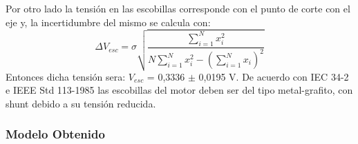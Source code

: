 \documentclass[11pt,letterpaper]{article}     %
\begin{document}
Por otro lado la tensión en las escobillas corresponde con el punto de corte con el eje y, la incertidumbre del mismo se calcula con:
\begin{equation}
	\Delta V_{esc} = \sigma \sqrt{\frac{\sum_{i=1}^{N}x_{i}^{2}}{N\sum_{i=1}^{N}x_{i}^{2}-\left(\sum_{i=1}^{N}x_{i}\right)^{2}}}
\end{equation}
Entonces dicha tensión sera: $V_{esc}$ = 0,3336 $\pm$ 0,0195 V. De acuerdo con IEC 34-2 e IEEE Std 113-1985 las escobillas del motor deben ser del tipo metal-grafito, con shunt debido a su tensión reducida. 
\subsubsection{Modelo Obtenido}
\end{document}
